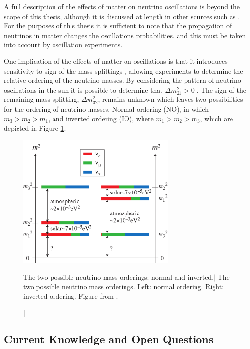 {A full description of the effects of matter on neutrino oscillations is beyond
the scope of this thesis, although it is discussed at length in other sources
such as \cite{GiuntiCarlo2007FoNP}. For the purposes of this thesis it is
sufficient to note that the propagation of neutrinos in matter changes the
oscillations probabilities, and this must be taken into account by oscillation
experiments.

One implication of the effects of matter on oscillations is that it introduces
sensitivity to sign of the mass splittings \cite{GiuntiCarlo2007FoNP}, 
allowing experiments to determine the relative ordering of the neutrino 
masses. By considering the pattern of neutrino oscillations in the sun it is 
possible to determine that $\Delta m_{21}^2 > 0$ \cite{PhysRevD.98.030001}. 
The sign of the remaining mass splitting, $\Delta m_{32}^2$, remains unknown 
which leaves two possibilities for the ordering of neutrino masses. Normal 
ordering (NO), in which $m_3 > m_2 > m_1$, and inverted ordering (IO), where $m_1 > m_2 
> m_3$, which are depicted in Figure \ref{fig:mass_ordering}. 
\begin{figure}
	\centering
	\includegraphics[width=0.7\textwidth]{figures/mass.pdf}
	\caption
	[The two possible neutrino mass orderings: normal and inverted.]
	{The two possible neutrino mass orderings. Left: normal ordering. Right: inverted ordering. 
	Figure from \cite{SKing}.}
	\label{fig:mass_ordering}
\end{figure}

\newpage
\subsection{Current Knowledge and Open Questions}

}
